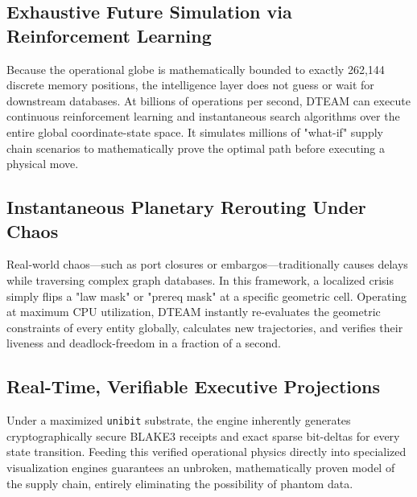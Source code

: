 \subsection{Exhaustive Future Simulation via Reinforcement Learning}
Because the operational globe is mathematically bounded to exactly 262,144 discrete memory positions, the intelligence layer does not guess or wait for downstream databases. At billions of operations per second, DTEAM can execute continuous reinforcement learning and instantaneous search algorithms over the entire global coordinate-state space. It simulates millions of "what-if" supply chain scenarios to mathematically prove the optimal path before executing a physical move.

\subsection{Instantaneous Planetary Rerouting Under Chaos}
Real-world chaos---such as port closures or embargos---traditionally causes delays while traversing complex graph databases. In this framework, a localized crisis simply flips a "law mask" or "prereq mask" at a specific geometric cell. Operating at maximum CPU utilization, DTEAM instantly re-evaluates the geometric constraints of every entity globally, calculates new trajectories, and verifies their liveness and deadlock-freedom in a fraction of a second.

\subsection{Real-Time, Verifiable Executive Projections}
Under a maximized \texttt{unibit} substrate, the engine inherently generates cryptographically secure BLAKE3 receipts and exact sparse bit-deltas for every state transition. Feeding this verified operational physics directly into specialized visualization engines guarantees an unbroken, mathematically proven model of the supply chain, entirely eliminating the possibility of phantom data.